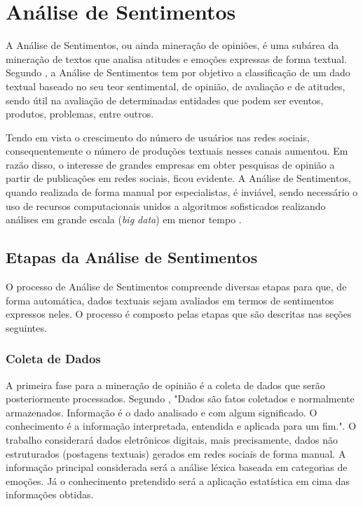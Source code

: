 \chapter{Análise de Sentimentos}
\label{cap:REFERENCIAL}

A Análise de Sentimentos, ou ainda mineração de opiniões, é uma subárea da mineração de textos que analisa atitudes e emoções expressas de forma textual. Segundo , a Análise de Sentimentos tem por objetivo a classificação de um dado textual baseado no seu teor sentimental, de opinião, de avaliação e de atitudes, sendo útil na avaliação de determinadas entidades que podem ser eventos, produtos, problemas, entre outros. 

Tendo em vista o crescimento do número de usuários nas redes sociais, consequentemente o número de produções textuais nesses canais aumentou. Em razão disso, o interesse de grandes empresas em obter pesquisas de opinião a partir de publicações em redes sociais, ficou evidente. A Análise de Sentimentos, quando realizada de forma manual por especialistas, é inviável, sendo necessário o uso de recursos computacionais unidos a algoritmos sofisticados realizando análises em grande escala (\textit{big data}) em menor tempo \cite{BAHRI2018669}.

\section{Etapas da Análise de Sentimentos}

O processo de Análise de Sentimentos compreende diversas etapas para que, de forma automática, dados textuais sejam avaliados em termos de sentimentos expressos neles. O processo é composto pelas etapas que são descritas nas seções seguintes.  

\subsection{Coleta de Dados}
\label{subsec:coletadados}
A primeira fase para a mineração de opinião é a coleta de dados que serão posteriormente processados. Segundo , "Dados são fatos coletados e normalmente armazenados. Informação é o dado analisado e com algum significado. O conhecimento é a informação interpretada, entendida e aplicada para um fim.". O trabalho considerará dados eletrônicos digitais, mais precisamente, dados não estruturados (postagens textuais) gerados em redes sociais de forma manual. A informação principal considerada será a análise léxica baseada em categorias de emoções. Já o conhecimento pretendido será a aplicação estatística em cima das informações obtidas.

